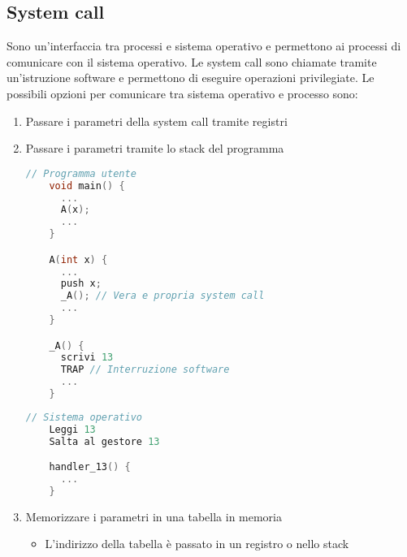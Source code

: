 \documentclass[a4paper]{article}
\begin{document}
\subsection{System call}
Sono un'interfaccia tra processi e sistema operativo e permettono ai processi di
comunicare con il sistema operativo. Le system call sono chiamate tramite un'istruzione
software e permettono di eseguire operazioni privilegiate. Le possibili opzioni per
comunicare tra sistema operativo e processo sono:
\begin{enumerate}
  \item Passare i parametri della system call tramite registri
  \item Passare i parametri tramite lo stack del programma
    \begin{lstlisting}[language=C]
    // Programma utente
    void main() {
      ...
      A(x);
      ...
    }

    A(int x) {
      ...
      push x;
      _A(); // Vera e propria system call
      ...
    }

    _A() {
      scrivi 13
      TRAP // Interruzione software
      ...
    }
    \end{lstlisting}
    \begin{lstlisting}[language=C]
    // Sistema operativo
    Leggi 13
    Salta al gestore 13

    handler_13() {
      ...
    }
    \end{lstlisting}
  \item Memorizzare i parametri in una tabella in memoria
    \begin{itemize}
      \item L'indirizzo della tabella è passato in un registro o nello stack
    \end{itemize}
    \begin{figure}[H]
      \centering
\end{figure}
\end{enumerate}
\end{document}
